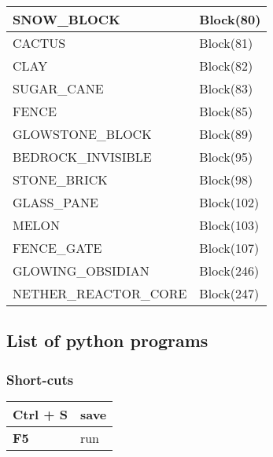 \documentclass[letterpaper,10pt,english]{sphinxmanual}
\begin{document}
\begin{longtable}{|l|l|}
SNOW\_BLOCK
 & 
Block(80)
\\
\hline
CACTUS
 & 
Block(81)
\\
\hline
CLAY
 & 
Block(82)
\\
\hline
SUGAR\_CANE
 & 
Block(83)
\\
\hline
FENCE
 & 
Block(85)
\\
\hline
GLOWSTONE\_BLOCK
 & 
Block(89)
\\
\hline
BEDROCK\_INVISIBLE
 & 
Block(95)
\\
\hline
STONE\_BRICK
 & 
Block(98)
\\
\hline
GLASS\_PANE
 & 
Block(102)
\\
\hline
MELON
 & 
Block(103)
\\
\hline
FENCE\_GATE
 & 
Block(107)
\\
\hline
GLOWING\_OBSIDIAN
 & 
Block(246)
\\
\hline
NETHER\_REACTOR\_CORE
 & 
Block(247)
\\
\hline\end{longtable}



\subsection{List of python programs}
\label{kid/minecraft:list-of-python-programs}

\subsubsection{Short-cuts}
\label{kid/minecraft:short-cuts}
\begin{tabulary}{\linewidth}{|L|L|}
\hline

\textbf{Ctrl} + \textbf{S}
 & 
save
\\
\hline
\textbf{F5}
 & 
run
\\
\hline\end{tabulary}
\end{document}
